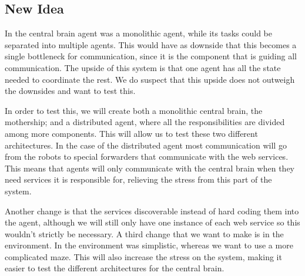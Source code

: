 \subsection{New Idea} 

In \cite{intframe} the central brain agent was a monolithic agent, while its
tasks could be separated into multiple agents. This would have as downside
that this becomes a single bottleneck for communication, since it is the
component that is guiding all communication. The upside of this system is
that one agent has all the state needed to coordinate the rest. We do
suspect that this upside does not outweigh the downsides and want to test
this.

In order to test this, we will create both a monolithic central brain, the
mothership; and a distributed agent, where all the responsibilities are
divided among more components. This will allow us to test these two
different architectures. In the case of the distributed agent most
communication will go from the robots to special forwarders that
communicate with the web services. This means that agents will only communicate
with the central brain when they need services it is responsible for, relieving
the stress from this part of the system.

Another change is that the services discoverable instead of hard coding them
into the agent, although we will still only have one instance of each web
service so this wouldn't strictly be necessary. A third change that we want to
make is in the environment. In \cite{intframe} the environment was simplistic,
whereas we want to use a more complicated maze. This will also increase the
stress on the system, making it easier to test the different architectures
for the central brain. 

% 
